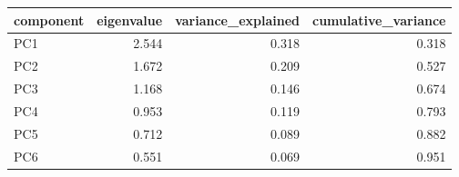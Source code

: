 \begin{tabular}{lrrr}
\toprule
component & eigenvalue & variance\_explained & cumulative\_variance \\
\midrule
PC1 & 2.544 & 0.318 & 0.318 \\
PC2 & 1.672 & 0.209 & 0.527 \\
PC3 & 1.168 & 0.146 & 0.674 \\
PC4 & 0.953 & 0.119 & 0.793 \\
PC5 & 0.712 & 0.089 & 0.882 \\
PC6 & 0.551 & 0.069 & 0.951 \\
\bottomrule
\end{tabular}
